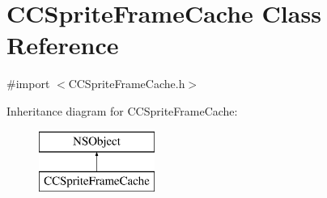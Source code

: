\hypertarget{class_c_c_sprite_frame_cache}{\section{C\-C\-Sprite\-Frame\-Cache Class Reference}
\label{class_c_c_sprite_frame_cache}
}


{\ttfamily \#import $<$C\-C\-Sprite\-Frame\-Cache.\-h$>$}

Inheritance diagram for C\-C\-Sprite\-Frame\-Cache\-:\begin{figure}[H]
\begin{center}
\leavevmode
\includegraphics[height=2.000000cm]{class_c_c_sprite_frame_cache}
\end{center}
\end{figure}
